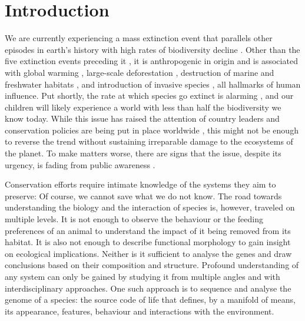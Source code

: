 \chapter{Introduction}
\label{introduction}

We are currently experiencing a mass extinction event that parallels
other episodes in earth's history with high rates of biodiversity
decline \citep{Pimm1995, Dirzo2003, Schipper2008, Barnosky2011,
Dirzo2014}. Other than the five extinction events preceding it
\citep{Kolbert2014}, it is anthropogenic in origin \citep{Leakey1996,
Ceballos2015} and is associated with global warming \citep{Cook2016,
Wuebbles2017}, large-scale deforestation \citep{Wright2005}, destruction
of marine and freshwater habitats \citep{Burkhead2012}, and introduction
of invasive species \citep{Mooney2001}, all hallmarks of human
influence. Put shortly, the rate at which species go extinct is alarming
\citep{Newbold2016, Ceballos2017, Hallmann2017}, and our children will
likely experience a world with less than half the biodiversity we know
today. While this issue has raised the attention of country leaders and
conservation policies are being put in place worldwide
\citep{Puntaru2017}, this might not be enough to reverse the trend
without sustaining irreparable damage to the ecosystems of the planet.
To make matters worse, there are signs that the issue, despite its
urgency, is fading from public awareness \citep{Kusmanoff2017}. 

Conservation efforts require intimate knowledge of the systems they aim
to preserve: Of course, we cannot save what we do not know. The road
towards understanding the biology and the interaction of species is,
however, traveled on multiple levels. It is not enough to observe the
behaviour or the feeding preferences of an animal to understand the
impact of it being removed from its habitat. It is also not enough to
describe functional morphology to gain insight on ecological
implications. Neither is it sufficient to analyse the genes and draw
conclusions based on their composition and structure. Profound
understanding of any system can only be gained by studying it from
multiple angles and with interdisciplinary approaches. One such approach
is to sequence and analyse the genome of a species: the source code of
life that defines, by a manifold of means, its appearance, features,
behaviour and interactions with the environment.

